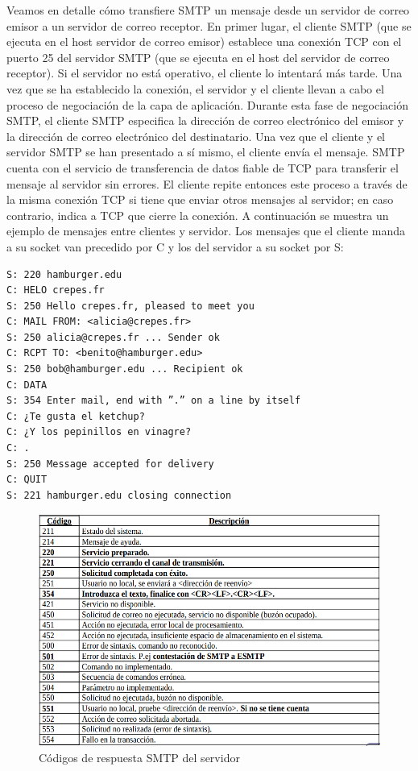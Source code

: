 \documentclass[a4paper,11pt]{article}
\begin{document}
Veamos  en detalle cómo transfiere SMTP un mensaje desde un servidor de correo emisor a un servidor de correo receptor. En primer lugar, el cliente SMTP (que se ejecuta en el host servidor de correo emisor) establece una conexión TCP con el puerto 25 del servidor SMTP (que se ejecuta en el host del servidor de correo receptor).  Si el servidor no está operativo, el cliente lo intentará más tarde. Una vez que se ha establecido la conexión, el servidor y el cliente llevan a cabo el proceso de negociación de la capa de aplicación. Durante esta fase de negociación SMTP, el cliente SMTP especifica la dirección de correo electrónico del emisor y la dirección de correo electrónico del destinatario. Una vez que el cliente y el servidor SMTP se han presentado a sí mismo, el cliente envía el mensaje. SMTP cuenta con el servicio de transferencia de datos fiable de TCP para transferir el mensaje al servidor sin errores. El cliente repite entonces este proceso a través de la misma conexión TCP si tiene que enviar otros mensajes al servidor; en caso contrario, indica a TCP que cierre la conexión. A continuación se muestra un ejemplo de mensajes entre clientes y servidor. Los mensajes que el cliente manda a su socket van precedido por C y los del servidor a su socket por S:

\begin{verbatim}
S: 220 hamburger.edu
C: HELO crepes.fr
S: 250 Hello crepes.fr, pleased to meet you
C: MAIL FROM: <alicia@crepes.fr>
S: 250 alicia@crepes.fr ... Sender ok
C: RCPT TO: <benito@hamburger.edu>
S: 250 bob@hamburger.edu ... Recipient ok
C: DATA
S: 354 Enter mail, end with ”.” on a line by itself
C: ¿Te gusta el ketchup?
C: ¿Y los pepinillos en vinagre?
C: .
S: 250 Message accepted for delivery
C: QUIT
S: 221 hamburger.edu closing connection
\end{verbatim}

\begin{figure}[h]
\centering
\caption{Códigos de respuesta SMTP del servidor}
\includegraphics[scale=1,width=1.1\textwidth]{codigo_smtp_servidor.png}
\end{figure}
\end{document}

